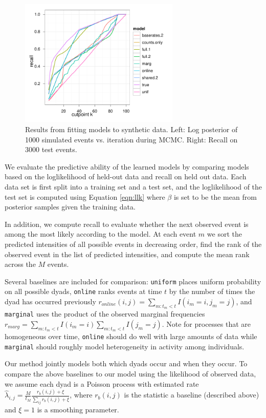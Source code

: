 \documentclass[11pt]{article}
\begin{document}
\begin{figure}
\center
\includegraphics[width=3in]{../figs/synthetic/test-recall.pdf}
\caption{Results from fitting models to synthetic data. Left: Log posterior of 1000 simulated events vs. iteration during MCMC.  Right: Recall on 3000 test events.}
\label{fig:synresults}
\end{figure}
We evaluate the predictive ability of the learned models by comparing models based on the loglikelihood of held-out data and recall on held out data.  Each data set is first split into a training set and a test set, and the loglikelihood of the test set is computed using Equation \ref{eqn:llk} where $\beta$ is set to be the mean from posterior samples given the training data.  

In addition, we compute recall to evaluate whether the next observed event is among the most likely according to the model.  At each event $m$ we sort the predicted intensities of all possible events in decreasing order, find the rank of the observed event in the list of predicted intensities, and compute the mean rank across the $M$ events.  

Several baselines are included for comparison: \texttt{uniform} places uniform probability on all possible dyads, \texttt{online} ranks events at time $t$ by the number of times the dyad has occurred previously $r_{online}(i,j) = \sum_{m:t_m < t} I(i_m=i,j_m=j)$, and \texttt{marginal} uses the product of the observed marginal frequencies $r_{marg} = \sum_{m:t_m < t} I(i_m=i) \sum_{m:t_m < t} I(j_m=j)$.  Note for processes that are homogeneous over time, \texttt{online} should do well with large amounts of data while \texttt{marginal} should roughly model heterogeneity in activity among individuals.  

Our method jointly models both which dyads occur and when they occur.  To compare the above baselines to our model using the likelihood of observed data, we assume each dyad is a Poisson process with estimated  rate $\hat{\lambda}_{i,j} = \frac{M}{t_M} \frac{r_{b}(i,j) + \xi}{\sum_{ij} r_{b}(i,j) + \xi}$, where $r_b(i,j)$ is the statistic a baseline (described above) and $\xi=1$ is a smoothing parameter.
\end{document}
